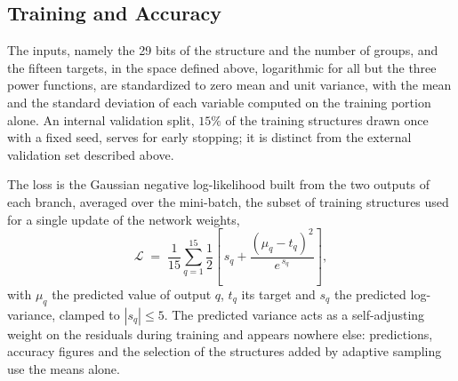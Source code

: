 \subsection{Training and Accuracy}

The inputs, namely the 29 bits of the structure and the number of groups, and
the fifteen targets, in the space defined above, logarithmic for all but the
three power functions, are standardized to
zero mean and unit variance, with the mean and the standard deviation of each
variable computed on the training portion alone. An internal validation split,
$15\%$ of the training structures drawn once with a fixed seed, serves for early
stopping; it is distinct from the external validation set described above.

The loss is the Gaussian negative log-likelihood built from the two outputs of
each branch, averaged over the mini-batch, the subset of training structures
used for a single update of the network weights,
%
\begin{equation}
  \mathcal{L} \;=\; \frac{1}{15}\sum_{q=1}^{15} \frac{1}{2}
  \left[\, s_q + \frac{\left(\mu_q - t_q\right)^2}{e^{\,s_q}} \right],
  \label{eg:eqn:nll}
\end{equation}
%
with $\mu_q$ the predicted value of output $q$, $t_q$ its target and $s_q$ the
predicted log-variance, clamped to $|s_q|\le5$. The predicted variance acts as a
self-adjusting weight on the residuals during training and appears nowhere
else: predictions, accuracy figures and the selection of the structures added by
adaptive sampling use the means alone.

